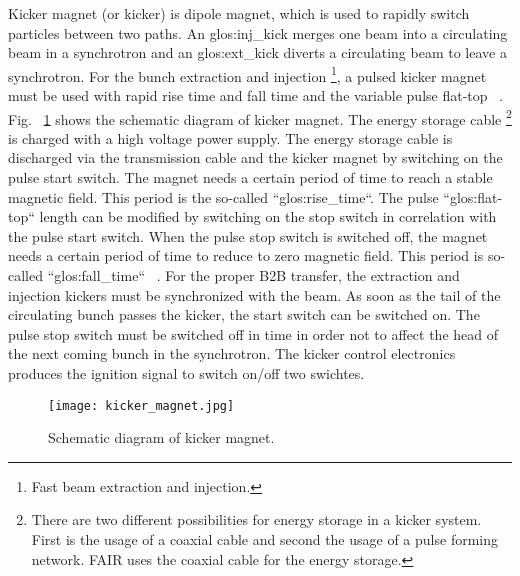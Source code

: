 Kicker magnet (or kicker) is dipole magnet, which is used to rapidly switch particles between two paths. An \gls{glos:inj_kick} merges one beam into a circulating beam in a synchrotron and an \gls{glos:ext_kick} diverts a circulating beam to leave a synchrotron. For the bunch extraction and injection \footnote{Fast beam extraction and injection.}, a pulsed kicker magnet must be used with rapid rise time and fall time and the variable pulse flat-top ~\cite{wang_design_1991, petzenhauser_concept_2016}. Fig. ~\ref{kicker_magnet} shows the schematic diagram of kicker magnet. The energy storage cable \footnote{There are two different possibilities for energy storage in a kicker system. First is the usage of a coaxial cable and second the usage of a pulse forming network. FAIR uses the coaxial cable for the energy storage.} is charged with a high voltage power supply. The energy storage cable is discharged via the transmission cable and the kicker magnet by switching on the pulse start switch. The magnet needs a certain period of time to reach a stable magnetic field. This period is the so-called ``\gls{glos:rise_time}``. The pulse ``\gls{glos:flat-top}`` length can be modified by switching on the stop switch in correlation with the pulse start switch. When the pulse stop switch is switched off, the magnet needs a certain period of time to reduce to zero magnetic field. This period is so-called ``\gls{glos:fall_time}`` ~\cite{udo_injection_2014}. For the proper B2B transfer, the extraction and injection kickers must be synchronized with the beam. As soon as the tail of the circulating bunch passes the kicker, the start switch can be switched on. The pulse stop switch must be switched off in time in order not to affect the head of the next coming bunch in the synchrotron. The kicker control electronics produces the ignition signal to switch on/off two swichtes.
\begin{figure}[!htb]
   \centering   
   \texttt{[image: kicker\_magnet.jpg]}
   \caption{Schematic diagram of kicker magnet.}
   \label{kicker_magnet}
\end{figure}
 
